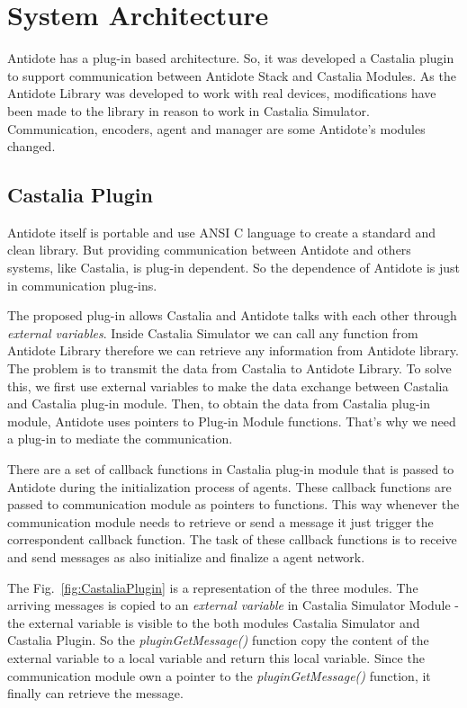\section{System Architecture}

Antidote has a plug-in based architecture. So, it was developed a Castalia plugin to support communication between Antidote Stack and Castalia Modules. As the Antidote Library was developed to work with real devices, modifications have been made to the library in reason to work in Castalia Simulator. Communication, encoders, agent and manager are some Antidote's modules changed.

\subsection{Castalia Plugin}

Antidote itself is portable and use ANSI C language to create a standard and clean library. But providing communication between Antidote and others systems, like Castalia, is plug-in dependent. So the dependence of Antidote is just in communication plug-ins.

The proposed plug-in allows Castalia and Antidote talks with each other through \textit{external variables}. Inside Castalia Simulator we can call any function from Antidote Library therefore we can retrieve any information from Antidote library. The problem is to transmit the data from Castalia to Antidote Library. To solve this, we first use external variables to make the data exchange between Castalia and Castalia plug-in module. Then, to obtain the data from Castalia plug-in module, Antidote uses pointers to Plug-in Module functions. That's why we need a plug-in to mediate the communication. 

There are a set of callback functions in Castalia plug-in module that is passed to Antidote during the initialization process of agents. These callback functions are passed to communication module as pointers to functions. This way whenever the communication module needs to retrieve or send a message it just trigger the correspondent callback function. The task of these callback functions is to receive and send messages as also initialize and finalize a agent network.

The Fig.~\ref{fig:CastaliaPlugin} is a representation of the three modules. The arriving messages is copied to an \textit{external variable} in Castalia Simulator Module - the external variable is visible to the both modules Castalia Simulator and Castalia Plugin. So the \textit{pluginGetMessage()} function copy the content of the external variable to a local variable and return this local variable. Since the communication module own a pointer to the \textit{pluginGetMessage()} function, it finally can retrieve the message.

